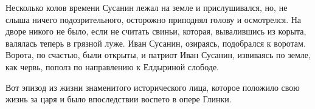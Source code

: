 Несколько колов времени Сусанин лежал на земле и прислушивался, но, не слыша
ничего подозрительного, осторожно приподнял голову и осмотрелся. На дворе никого
не было, если не считать свиньи, которая, вывалившись из корыта, валялась теперь
в грязной луже. Иван Сусанин, озираясь, подобрался к воротам. Ворота, по
счастью, были открыты, и патриот Иван Сусанин, извиваясь по земле, как червь,
пополз по направлению к Елдыриной слободе.

Вот эпизод из жизни знаменитого исторического лица, которое положило свою жизнь
за царя и было впоследствии воспето в опере Глинки.